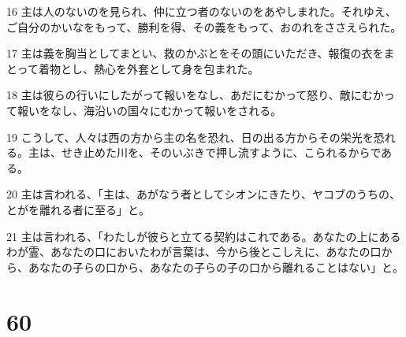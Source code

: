 \par 16 主は人のないのを見られ、仲に立つ者のないのをあやしまれた。それゆえ、ご自分のかいなをもって、勝利を得、その義をもって、おのれをささえられた。
\par 17 主は義を胸当としてまとい、救のかぶとをその頭にいただき、報復の衣をまとって着物とし、熱心を外套として身を包まれた。
\par 18 主は彼らの行いにしたがって報いをなし、あだにむかって怒り、敵にむかって報いをなし、海沿いの国々にむかって報いをされる。
\par 19 こうして、人々は西の方から主の名を恐れ、日の出る方からその栄光を恐れる。主は、せき止めた川を、そのいぶきで押し流すように、こられるからである。
\par 20 主は言われる、「主は、あがなう者としてシオンにきたり、ヤコブのうちの、とがを離れる者に至る」と。
\par 21 主は言われる、「わたしが彼らと立てる契約はこれである。あなたの上にあるわが霊、あなたの口においたわが言葉は、今から後とこしえに、あなたの口から、あなたの子らの口から、あなたの子らの子の口から離れることはない」と。

\chapter{60}

